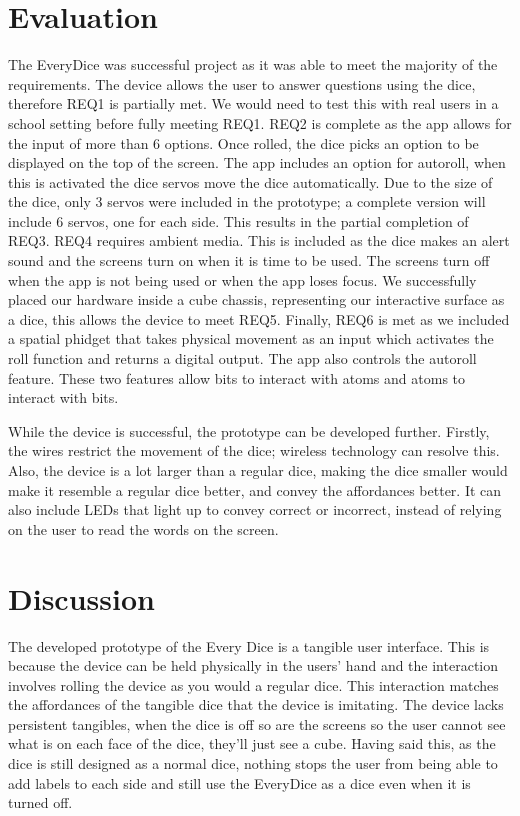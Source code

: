 \documentclass{sigchi}
\begin{document}



\section{Evaluation}

The EveryDice was successful project as it was able to meet the majority of the requirements.  The device allows the user to answer questions using the dice, therefore REQ1 is partially met. We would need to test this with real users in a school setting before fully meeting REQ1. REQ2 is complete as the app allows for the input of more than 6 options. Once rolled, the dice picks an option to be displayed on the top of the screen. The app includes an option for autoroll, when this is activated the dice servos move the dice automatically. Due to the size of the dice, only 3 servos were included in the prototype; a complete version will include 6 servos, one for each side. This results in the partial completion of REQ3. REQ4 requires ambient media. This is included as the dice makes an alert sound and the screens turn on when it is time to be used. The screens turn off when the app is not being used or when the app loses focus. We successfully placed our hardware inside a cube chassis, representing our interactive surface as a dice, this allows the device to meet REQ5. Finally, REQ6 is met as we included a spatial phidget that takes physical movement as an input which activates the roll function and returns a digital output. The app also controls the autoroll feature. These two features allow bits to interact with atoms and atoms to interact with bits. 

While the device is successful, the prototype can be developed further. Firstly, the wires restrict the movement of the dice; wireless technology can resolve this. Also, the device is a lot larger than a regular dice, making the dice smaller would make it resemble a regular dice better, and convey the affordances better. It can also include LEDs that light up to convey correct or incorrect, instead of relying on the user to read the words on the screen. 

\section{Discussion}

The developed prototype of the Every Dice is a tangible user interface. This is because the device can be held physically in the users’ hand and the interaction involves rolling the device as you would a regular dice. This interaction matches the affordances of the tangible dice that the device is imitating. The device lacks persistent tangibles, when the dice is off so are the screens so the user cannot see what is on each face of the dice, they’ll just see a cube. Having said this, as the dice is still designed as a normal dice, nothing stops the user from being able to add labels to each side and still use the EveryDice as a dice even when it is turned off. 
\end{document}
